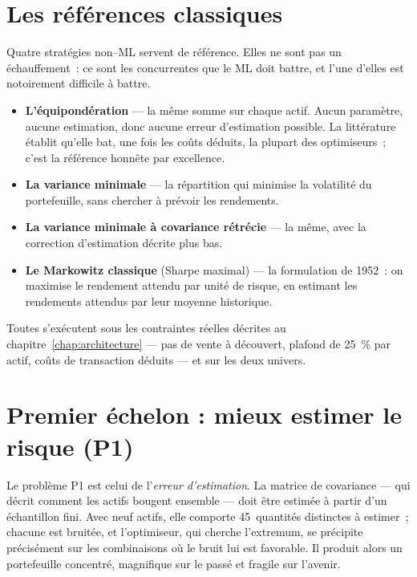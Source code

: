 \section{Les références classiques}

Quatre stratégies non--ML servent de référence. Elles ne sont pas un
échauffement~: ce sont les concurrentes que le ML doit battre, et l'une d'elles
est notoirement difficile à battre.

\begin{itemize}
  \item \textbf{L'équipondération} — la même somme sur chaque actif. Aucun
        paramètre, aucune estimation, donc aucune erreur d'estimation
        possible. La littérature établit qu'elle bat, une fois les coûts
        déduits, la plupart des optimiseurs~; c'est la référence honnête par
        excellence.
  \item \textbf{La variance minimale} — la répartition qui minimise la
        volatilité du portefeuille, sans chercher à prévoir les rendements.
  \item \textbf{La variance minimale à covariance rétrécie} — la même, avec la
        correction d'estimation décrite plus bas.
  \item \textbf{Le Markowitz classique} (Sharpe maximal) — la formulation de
        1952~: on maximise le rendement attendu par unité de risque, en
        estimant les rendements attendus par leur moyenne historique.
\end{itemize}

Toutes s'exécutent sous les contraintes réelles décrites au
chapitre~\ref{chap:architecture} — pas de vente à découvert, plafond de 25~\%
par actif, coûts de transaction déduits — et sur les deux univers.

\section{Premier échelon : mieux estimer le risque (P1)}

Le problème P1 est celui de l'\emph{erreur d'estimation}. La matrice de
covariance — qui décrit comment les actifs bougent ensemble — doit être estimée
à partir d'un échantillon fini. Avec neuf actifs, elle comporte 45~quantités
distinctes à estimer~; chacune est bruitée, et l'optimiseur, qui cherche
l'extremum, se précipite précisément sur les combinaisons où le bruit lui est
favorable. Il produit alors un portefeuille concentré, magnifique sur le passé et
fragile sur l'avenir.

